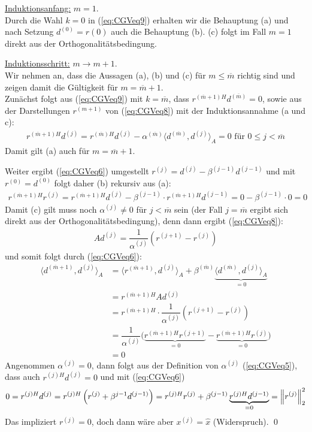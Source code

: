 \underline{Induktionsanfang:} $m=1$. \\
Durch die Wahl $k=0$ in (\ref{eq:CGVeq9}) erhalten wir die Behauptung (a) 
und nach Setzung $d^{(0)}=r{(0)}$ auch die Behauptung (b). (c) folgt im Fall $m=1$ direkt aus der 
Orthogonalitätsbedingung. 

\underline{Induktionsschritt:} $m\rightarrow m+1$. \\
Wir nehmen an, dass die Aussagen (a), (b) und (c) 
für $m\leq\overline{m}$ richtig sind und zeigen damit die Gültigkeit für $m=\overline{m}+1$. \\
Zunächst folgt aus (\ref{eq:CGVeq9}) mit $k=\overline{m}$, dass ${r^{(\overline{m}+1)H}}d^{(\overline{m})} = 0$, 
sowie aus der Darstellungen $r^{(m+1)}$ von (\ref{eq:CGVeq8}) mit der Induktionsannahme (a und c):
%
\begin{align*}
  {r^{(\overline{m}+1)H}}d^{(j)} 
  = {r^{(\overline{m})H}}d^{(j)} - \alpha^{(\overline{m})}\langle d^{(\overline{m})}, d^{(j)} \rangle_A 
  = 0 
  \text{ für } 0\leq j < \overline{m}
\end{align*}
%
Damit gilt (a) auch für $m=\overline{m}+1$. 

Weiter ergibt (\ref{eq:CGVeq6}) umgestellt $r^{(j)} = d^{(j)} - \beta^{(j-1)}d^{(j-1)}$ und mit $r^{(0)}=d^{(0)}$ folgt 
daher (b) rekursiv aus (a):
%
\begin{align*}
  {r^{(\overline{m}+1)H}}r^{(j)} 
  = {r^{(\overline{m}+1)H}}d^{(j)} - \beta^{(j-1)}\cdot {r^{(\overline{m}+1)H}}d^{(j-1)} 
  = 0 - \beta^{(j-1)}\cdot 0 
  = 0
\end{align*}
%
Damit (c) gilt muss noch $\alpha^{(j)}\neq 0$ für $j<\overline{m}$ sein (der Fall $j=\overline{m}$ ergibt sich direkt aus 
der Orthogonalitätsbedingung), denn dann ergibt (\ref{eq:CGVeq8}):
%
\begin{align*}
  Ad^{(j)} = \dfrac{1}{\alpha^{(j)}} \left(r^{(j+1)}- r^{(j)}\right)
\end{align*}
%
und somit folgt durch (\ref{eq:CGVeq6}):
%
\begin{align*}
  \langle d^{(\overline{m}+1)}, d^{(j)}\rangle_A 
  &= \langle r^{(\overline{m}+1)}, d^{(j)}\rangle_A 
  + \beta^{(\overline{m})}\underbrace{\langle d^{(\overline{m})}, d^{(j)}\rangle_A}_{=0}\\
  &= {r^{(\overline{m}+1)H}}Ad^{(j)} \\
  &= r^{(\overline{m}+1)H}\cdot\dfrac{1}{\alpha^{(j)}} \left(r^{(j+1)}- r^{(j)}\right) \\
  &= \dfrac{1}{\alpha^{(j)}} 
  \Big(\underbrace{r^{(\overline{m}+1)H}r^{(j+1)}}_{=0} - \underbrace{r^{(\overline{m}+1)H}r^{(j)}}_{=0}\Big) \\
  &= 0 
\end{align*}
%
Angenommen $\alpha^{(j)} = 0$, dann folgt aus der Definition von $\alpha^{(j)}$ (\ref{eq:CGVeq5}), 
dass auch ${r^{(j)H}}d^{(j)}=0$ und mit (\ref{eq:CGVeq6}) 
%
\begin{align*}
  0 = {r^{(j)H}}d^{(j)}
  = {r^{(j)H}}\left(r^{(j)}+\beta^{j-1}d^{(j-1)}\right) 
  = {r^{(j)H}}r^{(j)}+\beta^{(j-1)}\underbrace{{r^{(j)H}}d^{(j-1)}}_{=0} 
  = \vertn{2}{r^{(j)}}_2^2
\end{align*}
Das impliziert $r^{(j)} = 0$, doch dann wäre aber $x^{(j)}=\hat{x}$ (Widerspruch). \qed 

